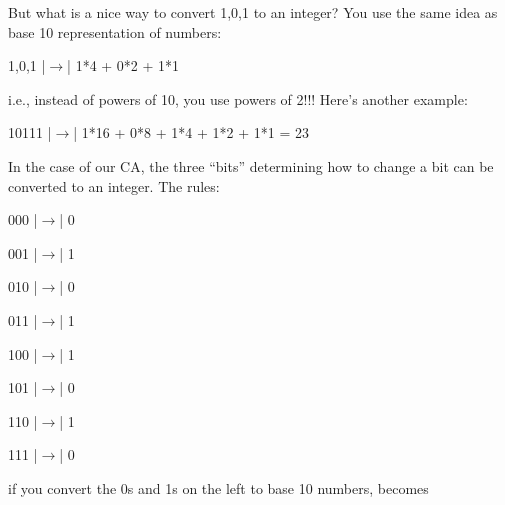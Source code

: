 But what is a nice way to convert 1,0,1 to an integer? You use the same idea as base 10 representation of numbers:



\begin{consolethree}[escapeinside=||]

1,0,1 |$\rightarrow$| 1*4 + 0*2 + 1*1

\end{consolethree}



i.e., instead of powers of 10, you use powers of 2!!! Here's another example:



\begin{consolethree}[escapeinside=||]

10111 |$\rightarrow$| 1*16 + 0*8 + 1*4 + 1*2 + 1*1 = 23

\end{consolethree}



In the case of our CA, the three ``bits'' determining how to change a bit can be converted to an integer. The rules:



\begin{consolethree}[escapeinside=||]

000 |$\rightarrow$| 0



001 |$\rightarrow$| 1



010 |$\rightarrow$| 0



011 |$\rightarrow$| 1



100 |$\rightarrow$| 1



101 |$\rightarrow$| 0



110 |$\rightarrow$| 1



111 |$\rightarrow$| 0

\end{consolethree}



if you convert the 0s and 1s on the left to base 10 numbers, becomes



